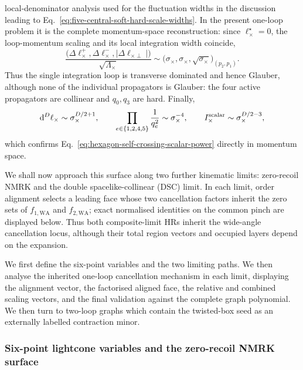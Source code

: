\documentclass[a4paper,11pt]{article}
\newcommand{\dd}{\mathrm d}
\begin{document}
local-denominator analysis used for the fluctuation widths in the discussion
leading to Eq.~\eqref{eq:five-central-soft-hard-scale-widths}.  In the present
one-loop problem it is the complete momentum-space reconstruction: since
\(\ell_\times^\star=0\), the loop-momentum scaling and its local integration
width coincide,
\begin{equation}
 \frac{\bigl(\Delta\ell_\times^+,\Delta\ell_\times^-,
       |\Delta\ell_{\times\perp}|\bigr)}{\sqrt{\Lambda_\times}}
 \sim\bigl(\sigma_\times,\sigma_\times,
           \sqrt{\sigma_\times}\bigr)_{(p_2,p_1)} .
 \label{eq:hexagon-wide-angle-loop-width}
\end{equation}
Thus the single integration loop is transverse dominated and hence Glauber,
although none of the individual propagators is Glauber: the four active
propagators are collinear and \(q_0,q_3\) are hard.  Finally,
\begin{equation}
 \dd^D\ell_\times\sim\sigma_\times^{D/2+1},
 \qquad
 \prod_{e\in\{1,2,4,5\}}\frac{1}{q_e^2}
 \sim\sigma_\times^{-4},
 \qquad
 I_\times^{\rm scalar}\sim\sigma_\times^{D/2-3},
 \label{eq:hexagon-wide-angle-momentum-power}
\end{equation}
which confirms Eq.~\eqref{eq:hexagon-self-crossing-scalar-power} directly in
momentum space.

We shall now approach this surface along two further kinematic limits:
zero-recoil NMRK and the double
spacelike-collinear (DSC) limit.  In each limit, order alignment selects a
leading face whose two cancellation factors inherit the zero sets of
\(f_{1,\mathrm{WA}}\) and \(f_{2,\mathrm{WA}}\); exact normalised identities
on the common pinch are displayed below.  Thus both
composite-limit HRs inherit the wide-angle cancellation locus, although their
total region vectors and occupied layers depend on the expansion.

We first define the six-point variables and the two limiting paths.  We then
analyse the inherited one-loop cancellation mechanism in each limit, displaying the
alignment vector, the factorised aligned face, the relative and combined
scaling vectors, and the final validation against the complete graph
polynomial.  We then turn to two-loop graphs which contain the twisted-box
seed as an externally labelled contraction minor.

\subsubsection{Six-point lightcone variables and the zero-recoil NMRK surface}
\end{document}
